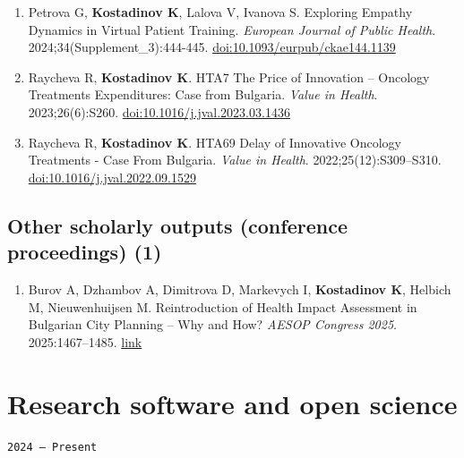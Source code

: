 \documentclass[
  10.5pt,
  a4paper,
  DIV=11,
  numbers=noendperiod]{scrartcl}
\providecommand{\tightlist}{%
  \setlength{\itemsep}{0pt}\setlength{\parskip}{0pt}}
\let\oldtexttt\texttt
\renewcommand{\texttt}[1]{{\color{cvbronze}\small\oldtexttt{#1}}}
\begin{document}
\begin{enumerate}
  \textbf{Kostadinov K}, Hristova-Atanasova E, Musurlieva N, Iskrov G,
  Stefanov R. Mapping the Policy Alternatives for Rare Cancer.
  \emph{European Journal of Public Health}. 2024;34:842-843.
  \href{https://doi.org/10.1093/eurpub/ckae144.2172}{doi:10.1093/eurpub/ckae144.2172}
\item
  Petrova G, \textbf{Kostadinov K}, Lalova V, Ivanova S. Exploring
  Empathy Dynamics in Virtual Patient Training. \emph{European Journal
  of Public Health}. 2024;34(Supplement\_3):444-445.
  \href{https://doi.org/10.1093/eurpub/ckae144.1139}{doi:10.1093/eurpub/ckae144.1139}
\item
  Raycheva R, \textbf{Kostadinov K}. HTA7 The Price of Innovation --
  Oncology Treatments Expenditures: Case from Bulgaria. \emph{Value in
  Health}. 2023;26(6):S260.
  \href{https://doi.org/10.1016/j.jval.2023.03.1436}{doi:10.1016/j.jval.2023.03.1436}
\item
  Raycheva R, \textbf{Kostadinov K}. HTA69 Delay of Innovative Oncology
  Treatments - Case From Bulgaria. \emph{Value in Health}.
  2022;25(12):S309--S310.
  \href{https://doi.org/10.1016/j.jval.2022.09.1529}{doi:10.1016/j.jval.2022.09.1529}
\end{enumerate}

\subsection{Other scholarly outputs (conference proceedings)
(1)}\label{other-scholarly-outputs-conference-proceedings-1}

\begin{enumerate}
\def\labelenumi{\arabic{enumi}.}
\setcounter{enumi}{62}
\tightlist
\item
  Burov A, Dzhambov A, Dimitrova D, Markevych I, \textbf{Kostadinov K},
  Helbich M, Nieuwenhuijsen M. Reintroduction of Health Impact
  Assessment in Bulgarian City Planning -- Why and How? \emph{AESOP
  Congress 2025}. 2025:1467--1485.
  \href{https://archive.aesop-planning.eu/items/13b23e16-2410-40c6-a6df-3976a7457c54}{link}
\end{enumerate}

\section{Research software and open
science}\label{research-software-and-open-science}

\texttt{2024\ –\ Present}
\end{document}
